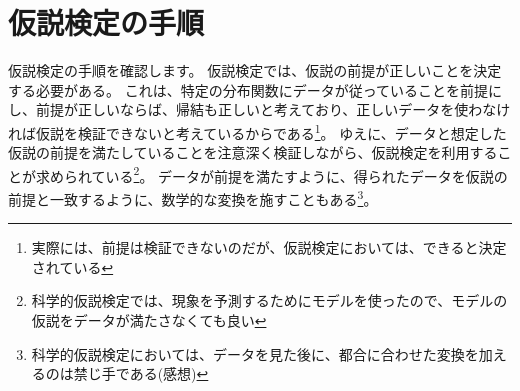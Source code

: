 \section{仮説検定の手順}
仮説検定の手順を確認します。
仮説検定では、仮説の前提が正しいことを決定する必要がある。
これは、特定の分布関数にデータが従っていることを前提にし、前提が正しいならば、帰結も正しいと考えており、正しいデータを使わなければ仮説を検証できないと考えているからである\footnote{実際には、前提は検証できないのだが、仮説検定においては、できると決定されている}。%
ゆえに、データと想定した仮説の前提を満たしていることを注意深く検証しながら、仮説検定を利用することが求められている\footnote{科学的仮説検定では、現象を予測するためにモデルを使ったので、モデルの仮説をデータが満たさなくても良い}。
データが前提を満たすように、得られたデータを仮説の前提と一致するように、数学的な変換を施すこともある\footnote{科学的仮説検定においては、データを見た後に、都合に合わせた変換を加えるのは禁じ手である(感想)}。

